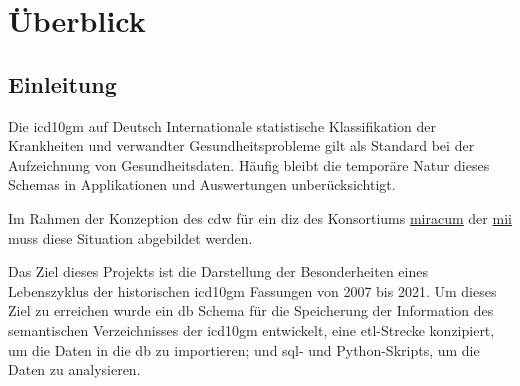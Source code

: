 \chapter{Überblick} \label{ch:introduction}

 \section{Einleitung} \label{sec:einl}

	Die \ac{icd10gm} auf Deutsch Internationale statistische Klassifikation der Krankheiten und  verwandter Gesundheitsprobleme gilt als Standard bei der Aufzeichnung von Gesundheitsdaten. Häufig bleibt die temporäre Natur dieses Schemas in Applikationen und Auswertungen unberücksichtigt.
	
	Im Rahmen der Konzeption des \ac{cdw} für ein  \ac{diz} des Konsortiums \href{https://www.miracum.org/}{\ac{miracum}} der \href{https://www.medizininformatik-initiative.de/de}{\ac{mii}} muss diese Situation abgebildet werden.%
	
	Das Ziel dieses Projekts ist die Darstellung der Besonderheiten eines Lebenszyklus der historischen \ac{icd10gm} Fassungen von 2007 bis 2021. Um dieses Ziel zu erreichen wurde ein \ac{db} Schema für die Speicherung der Information des semantischen Verzeichnisses der \ac{icd10gm} entwickelt, eine \ac{etl}-Strecke konzipiert, um die Daten in die \ac{db} zu importieren; und \ac{sql}- und Python-Skripts, um die Daten zu analysieren.